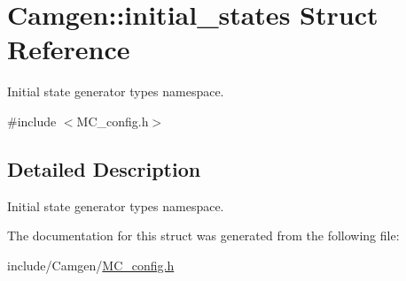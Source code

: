 \hypertarget{a00308}{\section{Camgen\-:\-:initial\-\_\-states Struct Reference}
\label{a00308}
}


Initial state generator types namespace.  




{\ttfamily \#include $<$M\-C\-\_\-config.\-h$>$}



\subsection{Detailed Description}
Initial state generator types namespace. 

The documentation for this struct was generated from the following file\-:\begin{DoxyCompactItemize}
\item 
include/\-Camgen/\hyperlink{a00670}{M\-C\-\_\-config.\-h}\end{DoxyCompactItemize}
